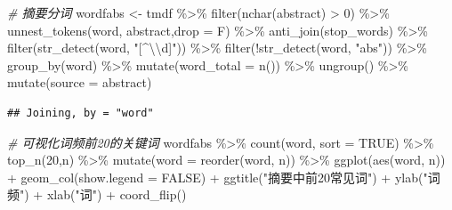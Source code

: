 \documentclass[]{tufte-book}
\newenvironment{Shaded}{}{}
\newcommand{\AttributeTok}[1]{\textcolor[rgb]{0.49,0.56,0.16}{#1}}
\newcommand{\CommentTok}[1]{\textcolor[rgb]{0.38,0.63,0.69}{\textit{#1}}}
\newcommand{\ConstantTok}[1]{\textcolor[rgb]{0.53,0.00,0.00}{#1}}
\newcommand{\DecValTok}[1]{\textcolor[rgb]{0.25,0.63,0.44}{#1}}
\newcommand{\FunctionTok}[1]{\textcolor[rgb]{0.02,0.16,0.49}{#1}}
\newcommand{\NormalTok}[1]{#1}
\newcommand{\OtherTok}[1]{\textcolor[rgb]{0.00,0.44,0.13}{#1}}
\newcommand{\SpecialCharTok}[1]{\textcolor[rgb]{0.25,0.44,0.63}{#1}}
\newcommand{\StringTok}[1]{\textcolor[rgb]{0.25,0.44,0.63}{#1}}
\begin{document}
\begin{Shaded}
\begin{Highlighting}[]
\CommentTok{\# 摘要分词}
\NormalTok{wordfabs }\OtherTok{\textless{}{-}}\NormalTok{ tmdf }\SpecialCharTok{\%\textgreater{}\%}
        \FunctionTok{filter}\NormalTok{(}\FunctionTok{nchar}\NormalTok{(abstract) }\SpecialCharTok{\textgreater{}} \DecValTok{0}\NormalTok{) }\SpecialCharTok{\%\textgreater{}\%}
        \FunctionTok{unnest\_tokens}\NormalTok{(word, abstract,}\AttributeTok{drop =}\NormalTok{ F) }\SpecialCharTok{\%\textgreater{}\%}
        \FunctionTok{anti\_join}\NormalTok{(stop\_words) }\SpecialCharTok{\%\textgreater{}\%}
        \FunctionTok{filter}\NormalTok{(}\FunctionTok{str\_detect}\NormalTok{(word, }\StringTok{"[\^{}}\SpecialCharTok{\textbackslash{}\textbackslash{}}\StringTok{d]"}\NormalTok{)) }\SpecialCharTok{\%\textgreater{}\%}
        \FunctionTok{filter}\NormalTok{(}\SpecialCharTok{!}\FunctionTok{str\_detect}\NormalTok{(word, }\StringTok{"abs"}\NormalTok{)) }\SpecialCharTok{\%\textgreater{}\%}
        \FunctionTok{group\_by}\NormalTok{(word) }\SpecialCharTok{\%\textgreater{}\%}
        \FunctionTok{mutate}\NormalTok{(}\AttributeTok{word\_total =} \FunctionTok{n}\NormalTok{()) }\SpecialCharTok{\%\textgreater{}\%}
        \FunctionTok{ungroup}\NormalTok{() }\SpecialCharTok{\%\textgreater{}\%}
        \FunctionTok{mutate}\NormalTok{(}\AttributeTok{source =} \StringTok{\textquotesingle{}abstract\textquotesingle{}}\NormalTok{)}
\end{Highlighting}
\end{Shaded}

\begin{verbatim}
## Joining, by = "word"
\end{verbatim}

\begin{Shaded}
\begin{Highlighting}[]
\CommentTok{\# 可视化词频前20的关键词}
\NormalTok{wordfabs }\SpecialCharTok{\%\textgreater{}\%}
        \FunctionTok{count}\NormalTok{(word, }\AttributeTok{sort =} \ConstantTok{TRUE}\NormalTok{) }\SpecialCharTok{\%\textgreater{}\%}
        \FunctionTok{top\_n}\NormalTok{(}\DecValTok{20}\NormalTok{,n) }\SpecialCharTok{\%\textgreater{}\%}
        \FunctionTok{mutate}\NormalTok{(}\AttributeTok{word =} \FunctionTok{reorder}\NormalTok{(word, n)) }\SpecialCharTok{\%\textgreater{}\%}
        \FunctionTok{ggplot}\NormalTok{(}\FunctionTok{aes}\NormalTok{(word, n)) }\SpecialCharTok{+}
  \FunctionTok{geom\_col}\NormalTok{(}\AttributeTok{show.legend =} \ConstantTok{FALSE}\NormalTok{) }\SpecialCharTok{+}
  \FunctionTok{ggtitle}\NormalTok{(}\StringTok{"摘要中前20常见词"}\NormalTok{) }\SpecialCharTok{+}
  \FunctionTok{ylab}\NormalTok{(}\StringTok{"词频"}\NormalTok{) }\SpecialCharTok{+}
  \FunctionTok{xlab}\NormalTok{(}\StringTok{"词"}\NormalTok{) }\SpecialCharTok{+}
  \FunctionTok{coord\_flip}\NormalTok{()}
\end{Highlighting}
\end{Shaded}
\end{document}
